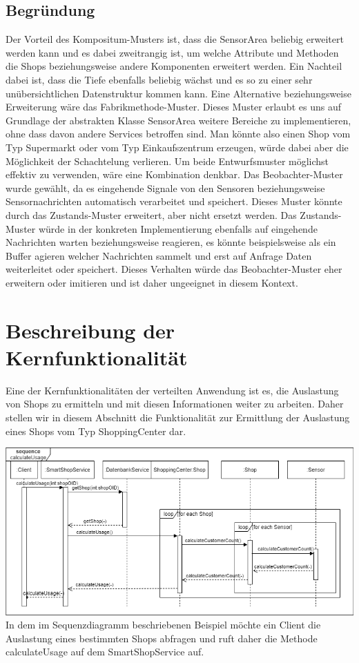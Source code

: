 \documentclass[runningheads]{llncs}
\begin{document}
\subsection{Begründung}
Der Vorteil des Kompositum-Musters ist, dass die SensorArea beliebig erweitert werden kann und es dabei zweitrangig ist, um welche Attribute und Methoden die Shops beziehungsweise andere Komponenten erweitert werden. 
Ein Nachteil dabei ist, dass die Tiefe ebenfalls beliebig wächst und es so zu einer sehr unübersichtlichen Datenstruktur kommen kann.
Eine Alternative beziehungsweise Erweiterung wäre das Fabrikmethode-Muster. 
Dieses Muster erlaubt es uns auf Grundlage der abstrakten Klasse SensorArea weitere Bereiche zu implementieren, ohne dass davon andere Services betroffen sind. 
Man könnte also einen Shop vom Typ Supermarkt oder vom Typ Einkaufszentrum erzeugen, würde dabei aber die Möglichkeit der Schachtelung verlieren. 
Um beide Entwurfsmuster möglichst effektiv zu verwenden, wäre eine Kombination denkbar.
Das Beobachter-Muster wurde gewählt, da es eingehende Signale von den Sensoren beziehungsweise Sensornachrichten automatisch verarbeitet und speichert.
Dieses Muster könnte durch das Zustands-Muster erweitert, aber nicht ersetzt werden.
Das Zustands-Muster würde in der konkreten Implementierung ebenfalls auf eingehende Nachrichten warten beziehungsweise reagieren, es könnte beispielsweise als ein Buffer agieren welcher Nachrichten sammelt und erst auf Anfrage Daten weiterleitet oder speichert.
Dieses Verhalten würde das Beobachter-Muster eher erweitern oder imitieren und ist daher ungeeignet in diesem Kontext.


\newpage
\section{Beschreibung der Kernfunktionalität}
Eine der Kernfunktionalitäten der verteilten Anwendung ist es, die Auslastung von Shops zu ermitteln und mit diesen Informationen weiter zu arbeiten.
Daher stellen wir in diesem Abschnitt die Funktionalität zur Ermittlung der Auslastung eines Shops vom Typ ShoppingCenter dar.

\includegraphics[width=\linewidth]{images/Sequenzdiagramm}
In dem im Sequenzdiagramm beschriebenen Beispiel möchte ein Client die Auslastung eines bestimmten Shops abfragen und ruft daher die Methode calculateUsage auf dem SmartShopService auf.
\\
\end{document}
